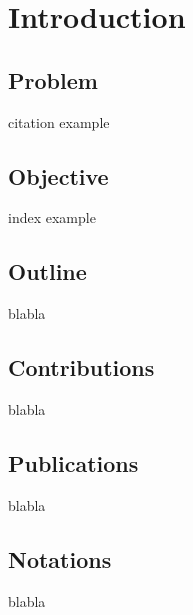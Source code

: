 %

\chapter{Introduction}


\section{Problem}

citation example \cite{book-full}


\section{Objective}

index example


\section{Outline}

blabla


\section{Contributions}

blabla


\section{Publications}

blabla


\section{Notations}

blabla%

